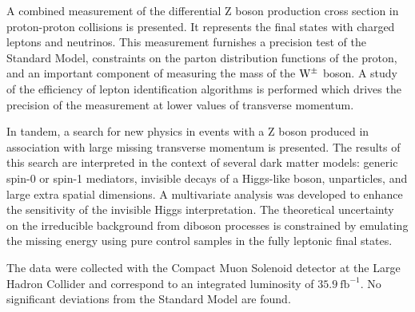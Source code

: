 % 
% 
%

A combined measurement of the differential Z boson production cross section in proton-proton collisions
is presented. It represents the final states with charged leptons and neutrinos.
This measurement furnishes a precision test of the Standard Model,
constraints on the parton distribution functions of the proton,
and an important component of measuring the mass of the $\mathrm{W}^{\pm}$ boson.
A study of the efficiency of lepton identification algorithms is performed which
drives the precision of the measurement at lower values of transverse momentum.

In tandem, a search for new physics in events with a Z boson produced in association with
large missing transverse momentum is presented.
The results of this search are interpreted in the context of several dark matter models:
generic spin-0 or spin-1 mediators, invisible decays of a Higgs-like boson,
unparticles, and large extra spatial dimensions.
A multivariate analysis was developed to enhance the sensitivity of the invisible Higgs interpretation.
The theoretical uncertainty on the irreducible background from diboson processes is constrained by
emulating the missing energy using pure control samples in the fully leptonic final states.

The data were collected with the Compact Muon Solenoid detector at the Large Hadron Collider and correspond to an
integrated luminosity of $35.9~\mathrm{fb}^{-1}$. No significant deviations from the Standard Model are found.


